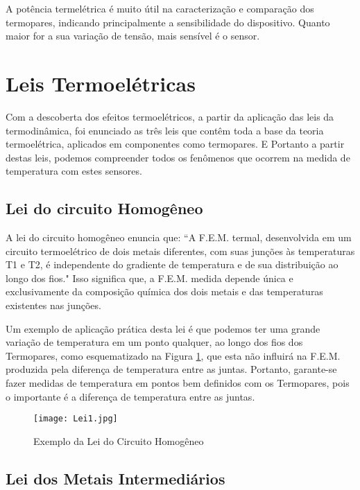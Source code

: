 \documentclass[a4paper,12pt]{report}
\begin{document}
	\singlespacing

	A potência termelétrica é muito útil na caracterização e comparação dos termopares, indicando principalmente a sensibilidade do dispositivo. Quanto maior for a sua variação de tensão, mais sensível é o sensor.

	
	\section{Leis Termoelétricas}
	
	Com a descoberta dos efeitos termoelétricos, a partir da aplicação das leis da termodinâmica, foi enunciado as três leis que contêm toda a base da teoria termoelétrica, aplicados em componentes como termopares. E Portanto a partir destas leis, podemos compreender todos os fenômenos que ocorrem na medida de temperatura com estes sensores. 

	\subsection{Lei do circuito Homogêneo}

	A lei do circuito homogêneo enuncia que: “A F.E.M. termal, desenvolvida em um circuito termoelétrico de dois metais diferentes, com suas junções às temperaturas T1 e T2, é independente do gradiente de temperatura e de sua distribuição ao longo dos fios." Isso significa que, a F.E.M. medida depende única e exclusivamente da composição química dos dois metais e das temperaturas existentes nas junções.

	\singlespacing

	Um exemplo de aplicação prática desta lei é que podemos ter uma grande variação de temperatura em um ponto qualquer, ao longo dos fios dos Termopares, como esquematizado na Figura \ref{lei1}, que esta não influirá na F.E.M. produzida pela diferença de temperatura entre as juntas. Portanto, garante-se fazer medidas de temperatura em pontos bem definidos com os Termopares, pois o importante é a diferença de temperatura entre as juntas.

	\singlespacing

	\begin{figure}[htbp]
		\centering
		\texttt{[image: Lei1.jpg]}
		\caption{Exemplo da Lei do Circuito Homogêneo}
		\label{lei1}
	\end{figure}
	
	\subsection{Lei dos Metais Intermediários}
\end{document}
